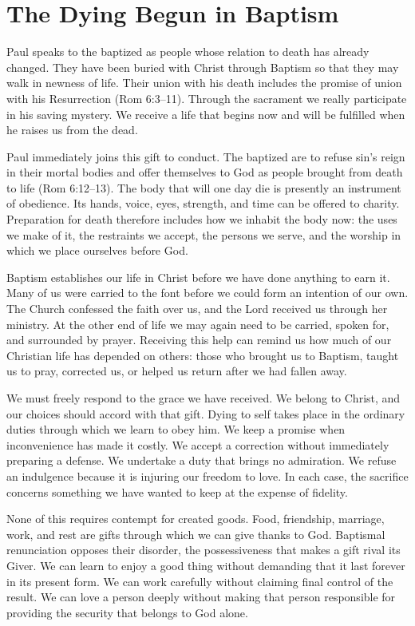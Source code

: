 \section{The Dying Begun in Baptism}

Paul speaks to the baptized as people whose relation to death has already changed. They have been buried with Christ through Baptism so that they may walk in newness of life. Their union with his death includes the promise of union with his Resurrection (Rom 6:3--11). Through the sacrament we really participate in his saving mystery. We receive a life that begins now and will be fulfilled when he raises us from the dead.

Paul immediately joins this gift to conduct. The baptized are to refuse sin's reign in their mortal bodies and offer themselves to God as people brought from death to life (Rom 6:12--13). The body that will one day die is presently an instrument of obedience. Its hands, voice, eyes, strength, and time can be offered to charity. Preparation for death therefore includes how we inhabit the body now: the uses we make of it, the restraints we accept, the persons we serve, and the worship in which we place ourselves before God.

Baptism establishes our life in Christ before we have done anything to earn it. Many of us were carried to the font before we could form an intention of our own. The Church confessed the faith over us, and the Lord received us through her ministry. At the other end of life we may again need to be carried, spoken for, and surrounded by prayer. Receiving this help can remind us how much of our Christian life has depended on others: those who brought us to Baptism, taught us to pray, corrected us, or helped us return after we had fallen away.

We must freely respond to the grace we have received. We belong to Christ, and our choices should accord with that gift. Dying to self takes place in the ordinary duties through which we learn to obey him. We keep a promise when inconvenience has made it costly. We accept a correction without immediately preparing a defense. We undertake a duty that brings no admiration. We refuse an indulgence because it is injuring our freedom to love. In each case, the sacrifice concerns something we have wanted to keep at the expense of fidelity.

None of this requires contempt for created goods. Food, friendship, marriage, work, and rest are gifts through which we can give thanks to God. Baptismal renunciation opposes their disorder, the possessiveness that makes a gift rival its Giver. We can learn to enjoy a good thing without demanding that it last forever in its present form. We can work carefully without claiming final control of the result. We can love a person deeply without making that person responsible for providing the security that belongs to God alone.

